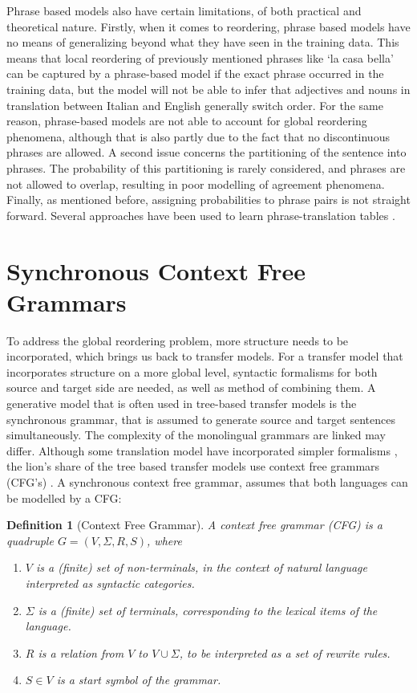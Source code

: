 \documentclass{report}
\theoremstyle{definition}
\theoremstyle{plain}
\newtheorem{definition}{Definition}
\begin{document}
Phrase based models also have certain limitations, of both practical and theoretical nature. Firstly, when it comes to reordering, phrase based models have no means of generalizing beyond what they have seen in the training data. This means that local reordering of previously mentioned phrases like `la casa bella' can be captured by a phrase-based model if the exact phrase occurred in the training data, but the model will not be able to infer that adjectives and nouns in translation between Italian and English generally switch order. For the same reason, phrase-based models are not able to account for global reordering phenomena, although that is also partly due to the fact that no discontinuous phrases are allowed. A second issue concerns the partitioning of the sentence into phrases. The probability of this partitioning is rarely considered, and phrases are not allowed to overlap, resulting in poor modelling of agreement phenomena. Finally, as mentioned before, assigning probabilities to phrase pairs is not straight forward. Several approaches have been used to learn phrase-translation tables \citep[see][p.130]{koehn2008statistical}.

\section{Synchronous Context Free Grammars}
\label{sec:SCFGs}

To address the global reordering problem, more structure needs to be incorporated, which brings us back to transfer models. For a transfer model that incorporates structure on a more global level, syntactic formalisms for both source and target side are needed, as well as method of combining them. A generative model that is often used in tree-based transfer models is the synchronous grammar, that is assumed to generate source and target sentences simultaneously. The complexity of the monolingual grammars are linked may differ. Although some translation model have incorporated simpler formalisms \citep[e.g., finite state machines, in][]{alshawi2000learning}, the lion's share of the tree based transfer models use context free grammars (CFG's) \citep{chomsky1956three}. A synchronous context free grammar, assumes that both languages can be modelled by a CFG:


\begin{definition}[Context Free Grammar]
A context free grammar (CFG) is a quadruple $G = (V, \Sigma, R, S)$, where\begin{enumerate}
\item $V$ is a (finite) set of non-terminals, in the context of natural language interpreted as syntactic categories.
\item $\Sigma$ is a (finite) set of terminals, corresponding to the lexical items of the language.
\item $R$ is a relation from $V$ to $V\cup\Sigma$, to be interpreted as a set of rewrite rules.
\item $S\in V$ is a start symbol of the grammar.
\end{enumerate}
\end{definition}
\end{document}
